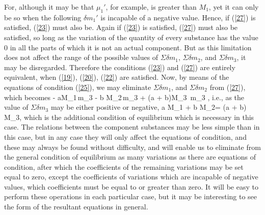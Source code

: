 \documentclass[12pt]{article}
\begin{document}
For, although it may be that $\mu_1'$, for example, is greater than $M_1$, yet it can only be so when the following $\delta m_1'$ is incapable of a negative value. Hence, if (\ref{27}) is satisfied, (\ref{23}) must also be. Again if (\ref{23}) is satisfied, (\ref{27}) must also be satisfied, so long as the variation of the quantity of every substance has the value 0 in all the parts of which it is not an actual component. But as this limitation does not affect the range of the possible values of  $\Sigma \delta m_1$, $\Sigma \delta m_2$, and $\Sigma \delta m_3$, it may be disregarded. Therefore the conditions (\ref{23}) and (\ref{27}) are entirely equivalent, when (\ref{19}), (\ref{20}), (\ref{22}) are satisfied. Now, by means of the equations of condition (\ref{25}), we may eliminate $\Sigma \delta m_1$, and $\Sigma \delta m_2$ from (\ref{27}), which becomes
\eqs - aM_1\,\Sigma \delta m_3 - b M_2\,\Sigma \delta m_3 + (a + b)M_3 \,\Sigma \delta m_3 ,        \label{28}\eqe
i.e., as the value of $\Sigma \delta m_3$ may be either positive or negative,
\eqs a M_1 + b M_2= (a + b) M_3,     \label{29}\eqe
which is the additional condition of equilibrium which is necessary in this case.
The relations between the component substances may be less simple than in this case, but in any case they will only affect the equations of condition, and these may always be found without difficulty, and will enable us to eliminate from the general condition of equilibrium as many variations as there are equations of condition, after which the coefficients of the remaining variations may be set equal to zero, except the coefficients of variations which are incapable of negative values, which coefficients must be equal to or greater than zero. It will be easy to perform these operations in each particular case, but it may be interesting to see the form of the resultant equations in general.
\end{document}
